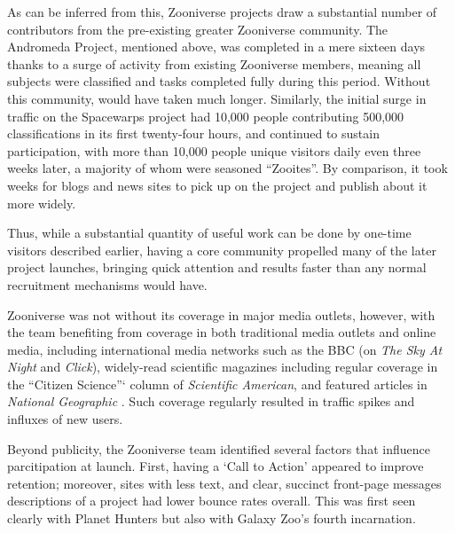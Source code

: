 \documentclass{sigchi}
\begin{document}
As can be inferred from this, Zooniverse projects draw a substantial number of contributors from the pre-existing greater Zooniverse community. The Andromeda Project, mentioned above, was completed in a mere sixteen days thanks to a surge of activity from existing Zooniverse members, meaning all subjects were classified and tasks completed fully during this period.  Without this community, would have taken much longer.  Similarly, the initial surge in traffic on the Spacewarps project had 10,000 people contributing 500,000 classifications in its first twenty-four hours, and continued to sustain participation, with more than 10,000 people unique visitors daily even three weeks later, a majority of whom were seasoned ``Zooites''.  By comparison, it took weeks for blogs and news sites to pick up on the project and publish about it more widely.

Thus, while a substantial quantity of useful work can be done by one-time visitors described earlier, having a core community propelled many of the later project launches, bringing quick attention and results faster than any normal recruitment mechanisms would have.  

Zooniverse was not without its coverage in major media outlets, however, with the team benefiting from coverage in both traditional media outlets and online media, including international media networks such as the BBC (on \emph{The Sky At Night} and \emph{Click}), widely-read scientific magazines including regular coverage in the ``Citizen Science''` column of \emph{Scientific American}, and featured articles in \emph{National Geographic} \cite{zooniverse-natgeo}.  Such coverage regularly resulted in traffic spikes and influxes of new users.

Beyond publicity, the Zooniverse team identified several factors that influence parcitipation at launch.  First, having a `Call to Action' appeared to improve retention; moreover, sites with less text, and clear, succinct front-page messages descriptions of a project had lower bounce rates overall.  This was first seen clearly with Planet Hunters but also with Galaxy Zoo's fourth incarnation. 

\end{document}
